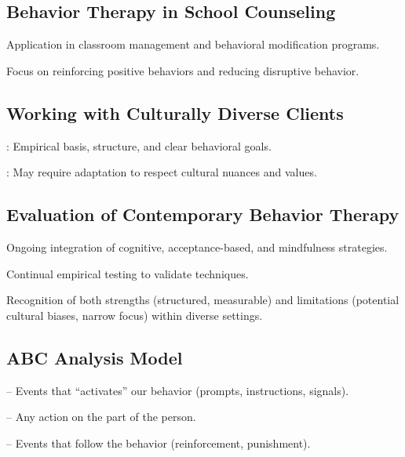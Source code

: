 \subsection{Behavior Therapy in School Counseling}
\begin{coloredlist}
    \item Application in classroom management and behavioral modification programs.
    \item Focus on reinforcing positive behaviors and reducing disruptive behavior.
\end{coloredlist}

\subsection{Working with Culturally Diverse Clients}
\begin{coloredlist}
    \item {}: Empirical basis, structure, and clear behavioral goals.
    \item {}: May require adaptation to respect cultural nuances and values.
\end{coloredlist}

\subsection{Evaluation of Contemporary Behavior Therapy}
\begin{coloredlist}
    \item Ongoing integration of cognitive, acceptance-based, and mindfulness strategies.
    \item Continual empirical testing to validate techniques.
    \item Recognition of both strengths (structured, measurable) and limitations (potential cultural biases, narrow focus) within diverse settings.
\end{coloredlist}

\subsection{ABC Analysis Model}
\begin{coloredlist}
    \item {} – Events that ``activates''  our behavior (prompts, instructions, signals).
    \item {} – Any action on the part of the person.
    \item {} – Events that follow the behavior (reinforcement, punishment).
\end{coloredlist}
